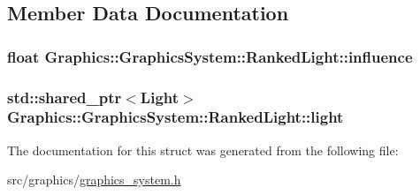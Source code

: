 \subsection{Member Data Documentation}
\hypertarget{struct_graphics_1_1_graphics_system_1_1_ranked_light_ab649d7094a1c6a93dfa3f855d5b09820}{}
\subsubsection[{influence}]{\setlength{\rightskip}{0pt plus 5cm}float Graphics\+::\+Graphics\+System\+::\+Ranked\+Light\+::influence}\label{struct_graphics_1_1_graphics_system_1_1_ranked_light_ab649d7094a1c6a93dfa3f855d5b09820}
\hypertarget{struct_graphics_1_1_graphics_system_1_1_ranked_light_a591a896fdc4a0cec0b9fe809e987587b}{}
\subsubsection[{light}]{\setlength{\rightskip}{0pt plus 5cm}std\+::shared\+\_\+ptr$<${\bf Light}$>$ Graphics\+::\+Graphics\+System\+::\+Ranked\+Light\+::light}\label{struct_graphics_1_1_graphics_system_1_1_ranked_light_a591a896fdc4a0cec0b9fe809e987587b}


The documentation for this struct was generated from the following file\+:\begin{DoxyCompactItemize}
\item 
src/graphics/\hyperlink{graphics__system_8h}{graphics\+\_\+system.\+h}\end{DoxyCompactItemize}
